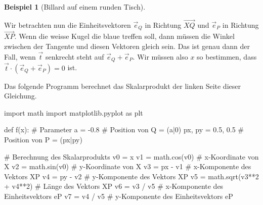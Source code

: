 \documentclass[
  letterpaper,
  DIV=11,
  oneside]{scrreprt}
\newenvironment{Shaded}{\begin{snugshade}}{\end{snugshade}}
\newcommand{\CommentTok}[1]{\textcolor[rgb]{0.37,0.37,0.37}{#1}}
\newcommand{\DecValTok}[1]{\textcolor[rgb]{0.68,0.00,0.00}{#1}}
\newcommand{\FloatTok}[1]{\textcolor[rgb]{0.68,0.00,0.00}{#1}}
\newcommand{\ImportTok}[1]{\textcolor[rgb]{0.00,0.46,0.62}{#1}}
\newcommand{\KeywordTok}[1]{\textcolor[rgb]{0.00,0.23,0.31}{#1}}
\newcommand{\NormalTok}[1]{\textcolor[rgb]{0.00,0.23,0.31}{#1}}
\newcommand{\OperatorTok}[1]{\textcolor[rgb]{0.37,0.37,0.37}{#1}}
\theoremstyle{definition}
\theoremstyle{definition}
\newtheorem{example}{Beispiel}[chapter]
\theoremstyle{remark}
\begin{document}
\begin{example}[Billard auf einem runden Tisch]
\begin{marginfigure}
{}

\caption{Billard auf einem runden Tisch}

\end{marginfigure}

Wir betrachten nun die Einheitsvektoren \(\vec{e}_Q\) in Richtung
\(\overrightarrow{XQ}\) und \(\vec{e}_P\) in Richtung
\(\overrightarrow{XP}\). Wenn die weisse Kugel die blaue treffen soll,
dann müssen die Winkel zwischen der Tangente und diesen Vektoren gleich
sein. Das ist genau dann der Fall, wenn \(\vec{t}\) senkrecht steht auf
\(\vec{e}_Q + \vec{e}_P\). Wir müssen also \(x\) so bestimmen, dass
\(\vec{t} \cdot (\vec{e}_Q + \vec{e}_P) = 0\) ist.

Das folgende Programm berechnet das Skalarprodukt der linken Seite
dieser Gleichung.

\begin{Shaded}
\begin{Highlighting}[]
\ImportTok{import}\NormalTok{ math}
\ImportTok{import}\NormalTok{ matplotlib.pyplot }\ImportTok{as}\NormalTok{ plt}

\KeywordTok{def}\NormalTok{ f(x):}
    \CommentTok{\# Parameter}
\NormalTok{    a }\OperatorTok{=} \OperatorTok{{-}}\FloatTok{0.8}           \CommentTok{\# Position von Q = (a|0)}
\NormalTok{    px, py }\OperatorTok{=} \FloatTok{0.5}\NormalTok{, }\FloatTok{0.5}  \CommentTok{\# Position von P = (px|py)}

    \CommentTok{\# Berechnung des Skalarprodukts}
\NormalTok{    v0 }\OperatorTok{=}\NormalTok{ x}
\NormalTok{    v1 }\OperatorTok{=}\NormalTok{ math.cos(v0)  }\CommentTok{\# x{-}Koordinate von X}
\NormalTok{    v2 }\OperatorTok{=}\NormalTok{ math.sin(v0)  }\CommentTok{\# y{-}Koordinate von X}
\NormalTok{    v3 }\OperatorTok{=}\NormalTok{ px }\OperatorTok{{-}}\NormalTok{ v1       }\CommentTok{\# x{-}Komponente des Vektors XP}
\NormalTok{    v4 }\OperatorTok{=}\NormalTok{ py }\OperatorTok{{-}}\NormalTok{ v2       }\CommentTok{\# y{-}Komponente des Vektors XP}
\NormalTok{    v5 }\OperatorTok{=}\NormalTok{ math.sqrt(v3}\OperatorTok{**}\DecValTok{2} \OperatorTok{+}\NormalTok{ v4}\OperatorTok{**}\DecValTok{2}\NormalTok{)  }\CommentTok{\# Länge des Vektors XP}
\NormalTok{    v6 }\OperatorTok{=}\NormalTok{ v3 }\OperatorTok{/}\NormalTok{ v5       }\CommentTok{\# x{-}Komponente des Einheitsvektors eP}
\NormalTok{    v7 }\OperatorTok{=}\NormalTok{ v4 }\OperatorTok{/}\NormalTok{ v5       }\CommentTok{\# y{-}Komponente des Einheitsvektors eP}
    

\end{Highlighting}
\end{Shaded}
\end{example}
\end{document}
